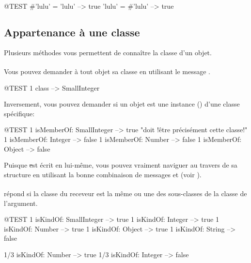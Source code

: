 \documentclass[a4paper,10pt,twoside]{book}
\begin{document}
\begin{code}{@TEST}
#'lulu' = 'lulu' --> true
'lulu' = #'lulu' --> true
\end{code}


\subsection{Appartenance à une classe}
Plusieurs méthodes vous permettent de connaître la classe d'un objet.

\paragraph{} Vous pouvez demander à tout objet sa classe en utilisant le message .
\begin{code}{@TEST}
1 class --> SmallInteger
\end{code}

Inversement, vous pouvez demander si un objet est une instance 
()
d'une classe spécifique:
\begin{code}{@TEST}
1 isMemberOf: SmallInteger --> true    "doit !être précisément cette classe!"
1 isMemberOf: Integer      --> false
1 isMemberOf: Number       --> false
1 isMemberOf: Object       --> false
\end{code}

Puisque \st est écrit en lui-même, vous pouvez vraiment naviguer au travers de sa structure en utilisant la bonne combinaison de messages  et  (voir ). 

\paragraph{}
 répond  si la classe du receveur est la même ou une des sous-classes de la classe de l'argument.

\begin{code}{@TEST}
1 isKindOf: SmallInteger --> true
1 isKindOf: Integer          --> true
1 isKindOf: Number         --> true
1 isKindOf: Object           --> true
1 isKindOf: String            --> false

1/3 isKindOf: Number      --> true
1/3 isKindOf: Integer        --> false
\end{code}
\end{document}
